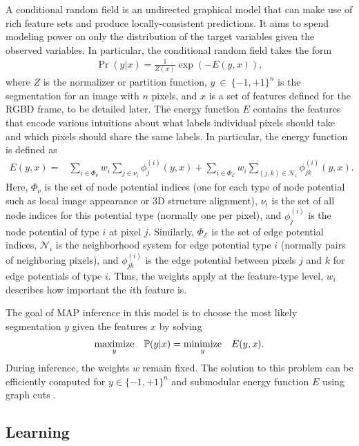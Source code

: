 \documentclass[graybox]{svmult}
\begin{document}
A conditional random field is an undirected graphical model that can make use of rich feature sets and produce locally-consistent predictions.  It aims to spend modeling power on only the distribution of the target variables given the observed variables.  In particular, the conditional random field takes the form
\begin{align}
  \Pr(y | x) = \frac{1}{Z(x)} \exp(-E(y, x)),
\end{align}
where $Z$ is the normalizer or partition function, $y~\in~\{-1,+1\}^n$ is the segmentation for an image with $n$ pixels, and $x$ is a set of features defined for the RGBD frame, to be detailed later.  The energy function $E$ contains the features that encode various intuitions about what labels individual pixels should take and which pixels should share the same labels.  In particular, the energy function is defined as
\begin{align}
  E(y, x) = & \sum_{i \in \Phi_\nu} w_i \sum_{j \in \nu_i} \phi_j^{(i)}(y, x) \label{eqn:energy} + \sum_{i \in \Phi_{\mathcal{E}}} w_i \sum_{(j,k) \in \mathcal{N}_i}  \phi_{jk}^{(i)}(y, x).
\end{align}
Here, $\Phi_\nu$ is the set of node potential indices (\ie one for each type of node potential such as local image appearance or 3D structure alignment), $\nu_i$ is the set of all node indices for this potential type (normally one per pixel), and $\phi_j^{(i)}$ is the node potential of type $i$ at pixel $j$.  Similarly, $\Phi_\mathcal{E}$ is the set of edge potential indices, $\mathcal{N}_i$ is the neighborhood system for edge potential type $i$ (normally pairs of neighboring pixels), and $\phi_{jk}^{(i)}$ is the edge potential between pixels $j$ and $k$ for edge potentials of type $i$.  Thus, the weights apply at the feature-type level, \ie $w_i$ describes how important the $i$th feature is.

The goal of MAP inference in this model is to choose the most likely segmentation $y$ given the features $x$ by solving
\begin{align}
  \underset{y}{\mbox{maximize}}\quad \mathbb{P}(y | x) = \underset{y}{\mbox{minimize}}\quad E(y, x).
\end{align}
During inference, the weights $w$ remain fixed.  The solution to this problem can be efficiently computed for $y \in \{-1, +1\}^n$ and submodular energy function $E$ using graph cuts \cite{boykov2001a}.

\pagebreak

\subsection{Learning}
\label{sec:learning}
\end{document}
